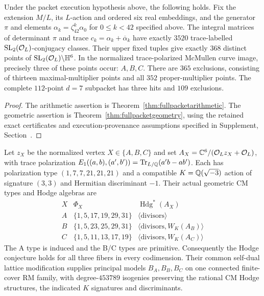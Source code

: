 \begin{theorem}\label{thm:packetintro}
Under the packet execution hypothesis above, the following holds.
Fix the extension $M/L$, its $L$-action and ordered six real embeddings,
and the generator $\pi$ and elements
$\alpha_k=\zeta_{42}^k\alpha_0$ for $0\leq k<42$ specified above.
The integral matrices of determinant $\pi$ and trace
$c_k=\alpha_k+\overline{\alpha}_k$ have exactly $3520$
trace-labelled $\operatorname{SL}_2(\mathcal O_L)$-conjugacy classes. Their upper fixed tuples
give exactly $368$ distinct points of
$\operatorname{SL}_2(\mathcal O_L)\backslash\mathbb H^6$.
In the normalized trace-polarized McMullen curve image, precisely three
of these points occur: $A,B,C$. There are $365$ exclusions, consisting
of thirteen maximal-multiplier points and all $352$ proper-multiplier
points. The complete $112$-point $d=7$ subpacket has three hits and
$109$ exclusions.
\end{theorem}
\begin{proof}
The arithmetic assertion is Theorem~\ref{thm:fullpacketarithmetic}.
The geometric assertion is Theorem~\ref{thm:fullpacketgeometry}, using
the retained exact certificates and execution-provenance assumptions
specified in Supplement, Section~.
\end{proof}

\begin{theoremA}\label{thm:A}
Let $z_X$ be the normalized vertex $X\in\{A,B,C\}$ and set
$A_X=\mathbb C^6/(\mathcal O_L z_X+\mathcal O_L)$, with trace polarization
$E_1((a,b),(a',b'))=\operatorname{Tr}_{L/\mathbb Q}(a'b-ab')$.
Each has polarization type $(1,7,7,21,21,21)$ and a compatible
$K=\mathbb Q(\sqrt{-3})$ action of signature $(3,3)$ and Hermitian
discriminant $-1$. Their actual geometric CM types and Hodge algebras are
\[
\begin{array}{c|c|c}
X&\Phi_X&\operatorname{Hdg}^*(A_X)\\ \hline
A&\{1,5,17,19,29,31\}&\langle\text{divisors}\rangle\\
B&\{1,5,23,25,29,31\}&\langle\text{divisors},W_K(A_B)\rangle\\
C&\{1,5,11,13,17,19\}&\langle\text{divisors},W_K(A_C)\rangle
\end{array}
\]
The A type is induced and the B/C types are primitive.
Consequently the Hodge conjecture holds for all three fibers in every
codimension. Their common self-dual lattice modification supplies
principal models $B_A,B_B,B_C$ on one connected finite-cover RM family,
with degree-$453789$ isogenies preserving the rational CM Hodge
structures, the indicated $K$ signatures and discriminants.
\end{theoremA}

